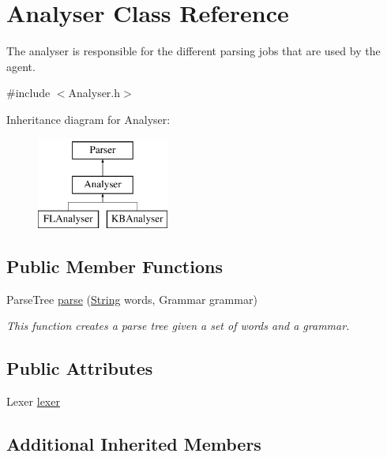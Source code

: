 \hypertarget{classAnalyser}{}\section{Analyser Class Reference}
\label{classAnalyser}


The analyser is responsible for the different parsing jobs that are used by the agent.  




{\ttfamily \#include $<$Analyser.\+h$>$}

Inheritance diagram for Analyser\+:\begin{figure}[H]
\begin{center}
\leavevmode
\includegraphics[height=3.000000cm]{classAnalyser}
\end{center}
\end{figure}
\subsection*{Public Member Functions}
\begin{DoxyCompactItemize}
\item 
Parse\+Tree \mbox{\hyperlink{classAnalyser_ad44df7523051fa8e152e1f623d00aa9a}{parse}} (\mbox{\hyperlink{classString}{String}} words, Grammar grammar)
\begin{DoxyCompactList}\small\item\em This function creates a parse tree given a set of words and a grammar. \end{DoxyCompactList}\end{DoxyCompactItemize}
\subsection*{Public Attributes}
\begin{DoxyCompactItemize}
\item 
Lexer \mbox{\hyperlink{classAnalyser_a4b5cb814df4274dbc426174a89b9838f}{lexer}}
\end{DoxyCompactItemize}
\subsection*{Additional Inherited Members}


